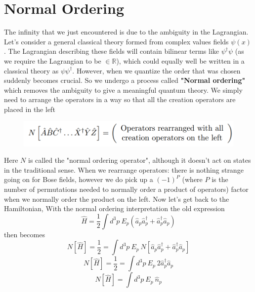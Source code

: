  
 
 
 
 
 
 
 
 
 
 
\section{Normal Ordering}
The infinity that we just encountered is due to the  ambiguity in the Lagrangian. Let's consider a general classical theory formed from complex values fields $\psi(x)$. The Lagrangian describing these fields will contain bilinear terms like $\psi^{\dagger}\psi$ (as we require the Lagrangian to be $\in \mathbb{R}$), which could equally well be written in a classical theory as $\psi\psi^{\dagger}$. However, when we quantize the order that was chosen suddenly becomes crucial. So we undergo a process called \textbf{"Normal ordering"} which removes the ambiguity to give a meaningful quantum theory. We simply need to arrange the operators in a way so that all the creation operators are placed in the left \\
\begin{figure}[!ht]
	\centering
	\includegraphics[scale=0.5]{Figures/NormalOrd.png}
\end{figure}
Here $N$ is called the "normal ordering operator", although it doesn't act on states in the traditional sense. When we rearrange operators: there is nothing strange going on for Bose fields, however we do pick up a ${(-1)}^{P}$ (where $P$ is the number of permutations needed to normally order a product of operators) factor when we normally order the product on the left.
Now let's get back to the Hamiltonian, With the normal ordering interpretation the old expression
\begin{equation}
    \hat{H}  = \frac{1}{2} \int d^{3}p \ E_{p}(\hat{a}_{p}\hat{a}^{\dagger}_{p} + \hat{a}^{\dagger}_{p}\hat{a}_{p})
\end{equation}
then becomes
$$N[\hat{H}] = \frac{1}{2} = \int d^{3}p \ E_{p} \ N[\hat{a}_{p}\hat{a}^{\dagger}_{p} + \hat{a}^{\dagger}_{p}\hat{a}_{p}]$$
$$N[\hat{H}] = \frac{1}{2} = \int d^{3}p \ E_{p} \ 2\hat{a}^{\dagger}_{p}\hat{a}_{p}$$
\begin{equation}
     N[\hat{H}] = \int d^{3}p \ E_{p} \ \hat{n}_{p}
\end{equation}
